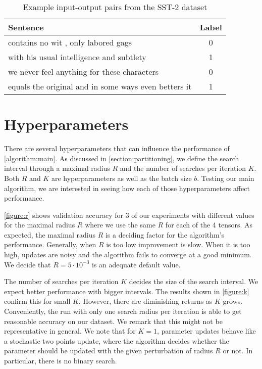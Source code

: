 \begin{table}
    \centering
    \caption{Example input-output pairs from the SST-2 dataset}
    \label{table: sst2}
    \bigskip
    \begin{tabular}{l c}
        \toprule
        \textbf{Sentence} & \textbf{Label} \\
        \midrule
        contains no wit , only labored gags & 0 \\
        with his usual intelligence and subtlety  & 1\\
        we never feel anything for these characters & 0\\
        equals the original and in some ways even betters it & 1 \\
        \bottomrule
    \end{tabular}
\end{table}

\section{Hyperparameters}
There are several hyperparameters that can influence
the performance of \autoref{algorithm:main}. As discussed 
in \autoref{section:partitioning}, we define the search 
interval through a maximal radius $R$ and the number of 
searches per iteration $K$. Both $R$ and $K$ are 
hyperparameters as well as the batch size $b$.
Testing our main algorithm, we are interested in seeing 
how each of those hyperparameters affect performance.

\autoref{figure:r} shows validation 
accuracy for 3 of our experiments with different 
values for the maximal radius $R$
where we use the same $R$ for each of the 4 tensors.
As expected, the maximal radius $R$ is a deciding factor 
for the algorithm's performance. 
Generally, when $R$ is too low improvement is slow.
When it is too high, updates are noisy and the algorithm
fails to converge at a good minimum. 
We decide that $R=5\cdot10^{-3}$ is an adequate 
default value. 

The number of searches per iteration $K$ decides the 
size of the search interval. We expect better performance
with bigger intervals. The results shown in 
\autoref{figure:k} confirm this for 
small $K$. However, there are diminishing returns as 
$K$ grows.
Conveniently, the run with only one search radius per
iteration is able to get reasonable accuracy on 
our dataset. We remark that this might 
not be representative in general.
We note that for $K=1$, parameter updates behave like a 
stochastic two points update, 
where the algorithm decides whether the parameter should be 
updated with the given perturbation of radius $R$ or not. 
In particular, there is no binary search.


